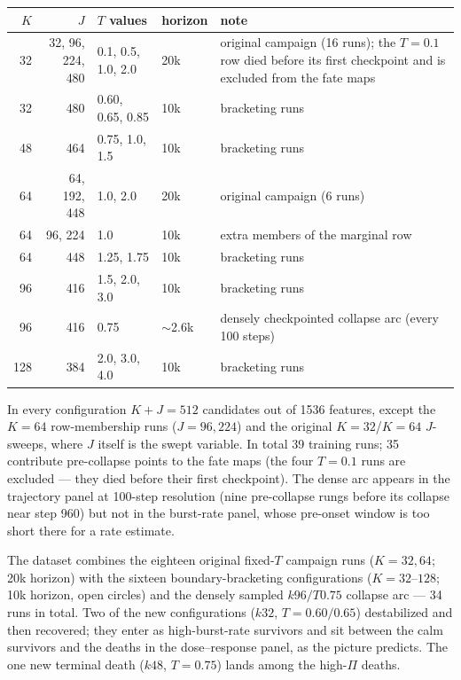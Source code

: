 \documentclass[11pt,a4paper]{article}
\newcommand{\Pisurr}{\Pi}
\begin{document}
\begin{center}\small
\begin{tabular}{rrp{2.6cm}lp{5.6cm}}
\toprule
\(K\) & \(J\) & \(T\) values & horizon & note \\
\midrule
32  & 32, 96, 224, 480 & 0.1, 0.5, 1.0, 2.0 & 20k & original campaign (16
runs); the \(T{=}0.1\) row died before its first checkpoint and is
excluded from the fate maps \\[2pt]
32  & 480 & 0.60, 0.65, 0.85 & 10k & bracketing runs \\
48  & 464 & 0.75, 1.0, 1.5 & 10k & bracketing runs \\
64  & 64, 192, 448 & 1.0, 2.0 & 20k & original campaign (6 runs) \\
64  & 96, 224 & 1.0 & 10k & extra members of the marginal row \\
64  & 448 & 1.25, 1.75 & 10k & bracketing runs \\
96  & 416 & 1.5, 2.0, 3.0 & 10k & bracketing runs \\
96  & 416 & 0.75 & \(\sim\)2.6k & densely checkpointed collapse arc (every
100 steps) \\
128 & 384 & 2.0, 3.0, 4.0 & 10k & bracketing runs \\
\bottomrule
\end{tabular}
\end{center}

In every configuration \(K + J = 512\) candidates out of 1536 features,
except the \(K{=}64\) row-membership runs (\(J = 96, 224\)) and the original
\(K{=}32\)/\(K{=}64\) \(J\)-sweeps, where \(J\) itself is the swept variable.
In total 39 training runs; 35 contribute pre-collapse points to the fate
maps (the four \(T{=}0.1\) runs are excluded --- they died before their
first checkpoint). The dense arc appears in the trajectory panel at
100-step resolution (nine pre-collapse rungs before its collapse near step
960) but not in the burst-rate panel, whose pre-onset window is too short
there for a rate estimate.

The dataset combines the eighteen original fixed-\(T\) campaign runs
(\(K = 32, 64\); 20k horizon) with the sixteen boundary-bracketing
configurations (\(K = 32\)--\(128\); 10k horizon, open circles) and the
densely sampled \(k96/T0.75\) collapse arc --- 34 runs in total. Two of
the new configurations (\(k32\), \(T = 0.60/0.65\)) destabilized and then
recovered; they enter as high-burst-rate survivors and sit between the calm
survivors and the deaths in the dose--response panel, as the picture
predicts. The one new terminal death (\(k48\), \(T = 0.75\)) lands among
the high-\(\Pisurr\) deaths.
\end{document}

